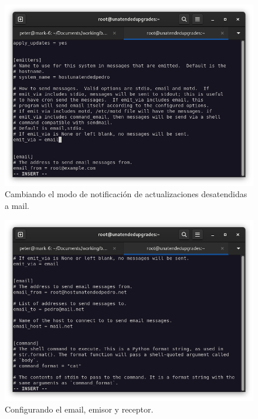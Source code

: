 \begin{figure}[H]
	\centering
	\includegraphics[scale=0.30]{02}
	\caption{Cambiando el modo de notificación de actualizaciones desatendidas a mail.}
\end{figure}


\begin{figure}[H]
	\centering
	\includegraphics[scale=0.30]{03}
	\caption{Configurando el email, emisor y receptor.}
\end{figure}




